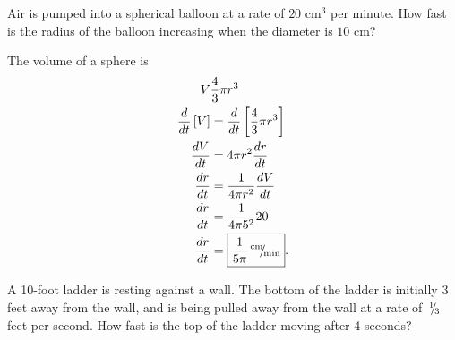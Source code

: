 \documentclass{hwset}
\date{29 March 2011}
\begin{document}
\begin{problem}[1.]
	Air is pumped into a spherical balloon at a rate of $20\text{ cm}^3$ per minute. How
	fast is the radius of the balloon increasing when the diameter is $10$ cm?
\end{problem}

\begin{solution}
	\begin{center}
	\end{center}
	The volume of a sphere is
	\begin{align*}
		V& \frac{4}{3} \pi r^3 \\
		\frac{d}{dt}\left[ V \right]&= \frac{d}{dt}\left[ \frac{4}{3} \pi r^3
			\right] \\
		\frac{dV}{dt}&= 4\pi r^2 \frac{dr}{dt} \\
		\frac{dr}{dt}&= \frac{1}{4\pi r^2} \frac{dV}{dt} \\
		\frac{dr}{dt}&= \frac{1}{4\pi 5^2} 20 \\
		\frac{dr}{dt}&= \boxed{\frac{1}{5\pi} \,^{\text{cm}}\!\!/\!_{\text{min}}}.
	\end{align*}
\end{solution}

\begin{problem}[2.]
	A 10-foot ladder is resting against a wall. The bottom of the ladder is
	initially 3 feet away from the wall, and is being pulled away from the wall at
	a rate of $\,^{1}\!\!/\!_{3}$ feet per second. How fast is the top of the ladder
	moving after 4 seconds?
\end{problem}
\end{document}
